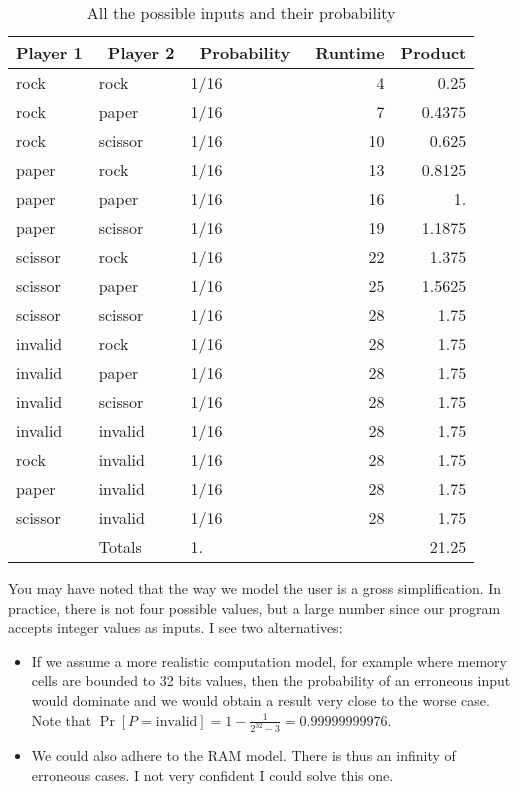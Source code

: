 \documentclass[11pt]{article}
\begin{document}
\begin{table}[htbp]
\caption{\label{tab:org30d0a32}All the possible inputs and their probability}
\centering
\begin{tabular}{lllrr}
\hline
Player 1 &  Player 2 &  Probability &  Runtime & Product\\
\hline
rock & rock & 1/16 & 4 & 0.25\\
rock & paper & 1/16 & 7 & 0.4375\\
rock & scissor & 1/16 & 10 & 0.625\\
paper & rock & 1/16 & 13 & 0.8125\\
paper & paper & 1/16 & 16 & 1.\\
paper & scissor & 1/16 & 19 & 1.1875\\
scissor & rock & 1/16 & 22 & 1.375\\
scissor & paper & 1/16 & 25 & 1.5625\\
scissor & scissor & 1/16 & 28 & 1.75\\
\hline
invalid & rock & 1/16 & 28 & 1.75\\
invalid & paper & 1/16 & 28 & 1.75\\
invalid & scissor & 1/16 & 28 & 1.75\\
invalid & invalid & 1/16 & 28 & 1.75\\
rock & invalid & 1/16 & 28 & 1.75\\
paper & invalid & 1/16 & 28 & 1.75\\
scissor & invalid & 1/16 & 28 & 1.75\\
\hline
 & Totals & 1. &  & 21.25\\
\end{tabular}
\end{table}

You may have noted that the way we model the user is a gross
simplification. In practice, there is not four possible values, but a
large number since our program accepts integer values as
inputs. I see two alternatives:
\begin{itemize}
\item If we assume a more realistic computation model, for example where
memory cells are bounded to 32 bits values, then the probability of
an erroneous input would dominate and we would obtain a result very
close to the worse case. Note that \(\Pr[P=\text{invalid}] =
   1 - \frac{1}{2^{32}-3} = 0.99999999976\).
\item We could also adhere to the RAM model. There is thus an infinity
of erroneous cases. I not very confident I could solve this one.
\end{itemize}
\end{document}

